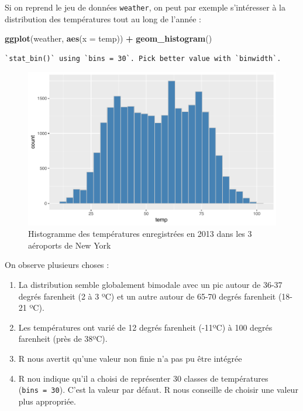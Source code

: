 \documentclass[a4paperpaper,]{article}
\newenvironment{Shaded}{\begin{snugshade}}{\end{snugshade}}
\newcommand{\KeywordTok}[1]{\textcolor[rgb]{0.13,0.29,0.53}{\textbf{#1}}}
\newcommand{\DataTypeTok}[1]{\textcolor[rgb]{0.13,0.29,0.53}{#1}}
\newcommand{\StringTok}[1]{\textcolor[rgb]{0.31,0.60,0.02}{#1}}
\newcommand{\OperatorTok}[1]{\textcolor[rgb]{0.81,0.36,0.00}{\textbf{#1}}}
\newcommand{\NormalTok}[1]{#1}
\providecommand{\tightlist}{%
  \setlength{\itemsep}{0pt}\setlength{\parskip}{0pt}}
\theoremstyle{definition}
\theoremstyle{definition}
\theoremstyle{definition}
\theoremstyle{remark}
\begin{document}
Si on reprend le jeu de données \texttt{weather}, on peut par exemple
s'intéresser à la distribution des températures tout au long de l'année
:

\begin{Shaded}
\begin{Highlighting}[]
\KeywordTok{ggplot}\NormalTok{(weather, }\KeywordTok{aes}\NormalTok{(}\DataTypeTok{x =}\NormalTok{ temp)) }\OperatorTok{+}
\StringTok{  }\KeywordTok{geom_histogram}\NormalTok{()}
\end{Highlighting}
\end{Shaded}

\begin{verbatim}
`stat_bin()` using `bins = 30`. Pick better value with `binwidth`.
\end{verbatim}

\begin{figure}[htpb]

{\centering \includegraphics[width=0.9\linewidth]{figure/unnamed-chunk-47-1} 

}

\caption{Histogramme des températures enregistrées en 2013 dans les 3 aéroports de New York}\label{fig:unnamed-chunk-47}
\end{figure}

On observe plusieurs choses :

\begin{enumerate}
\def\labelenumi{\arabic{enumi}.}
\tightlist
\item
  La distribution semble globalement bimodale avec un pic autour de
  36-37 degrés farenheit (2 à 3 ºC) et un autre autour de 65-70 degrés
  farenheit (18-21 ºC).
\item
  Les températures ont varié de 12 degrés farenheit (-11ºC) à 100 degrés
  farenheit (près de 38ºC).
\item
  R nous avertit qu'une valeur non finie n'a pas pu être intégrée
\item
  R nou indique qu'il a choisi de représenter 30 classes de températures
  (\texttt{bins\ =\ 30}). C'est la valeur par défaut. R nous conseille
  de choisir une valeur plus appropriée.
\end{enumerate}
\end{document}
